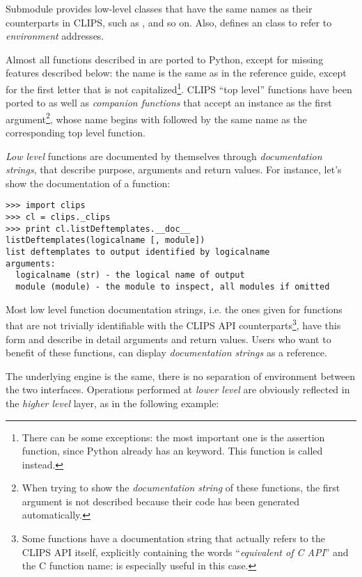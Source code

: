 Submodule  provides low-level classes that have the
same names as their counterparts in CLIPS, such as ,
 and so on. Also,  defines an
 class to refer to \emph{environment} addresses.

Almost all functions described in \clipsapg{} are ported to Python,
except for missing features described below: the name is the same as in
the reference guide, except for the first letter that is not
capitalized\footnote{There can be some exceptions: the most
important one is the assertion function, since Python already has an
 keyword. This function is called 
instead.}. CLIPS ``top level'' functions have been ported to
 as well as \emph{companion functions} that accept
an  instance as the first argument\footnote{When
trying to show the \emph{documentation string} of these functions, the
first argument is not described because their code has been generated
automatically.}, whose name begins with  followed by the same
name as the corresponding top level function.

\emph{Low level} functions are documented by themselves through
\emph{documentation strings}, that describe purpose, arguments and return
values. For instance, let's show the documentation of a function:

\begin{verbatim}
>>> import clips
>>> cl = clips._clips
>>> print cl.listDeftemplates.__doc__
listDeftemplates(logicalname [, module])
list deftemplates to output identified by logicalname
arguments:
  logicalname (str) - the logical name of output
  module (module) - the module to inspect, all modules if omitted
\end{verbatim}

Most low level function documentation strings, i.e. the ones given
for functions that are not trivially identifiable with the CLIPS API
counterparts\footnote{Some functions have a documentation string that
actually refers to the CLIPS API itself, explicitly containing the words
``\emph{equivalent of C API}'' and the C function name: \clipsapg{} is
especially useful in this case.}, have this form and describe in detail
arguments and return values. Users who want to benefit of these
functions, can display \emph{documentation strings} as a reference.

The underlying engine is the same, there is no separation of environment
between the two interfaces. Operations performed at \emph{lower level}
are obviously reflected in the \emph{higher level} layer, as in the
following example:

